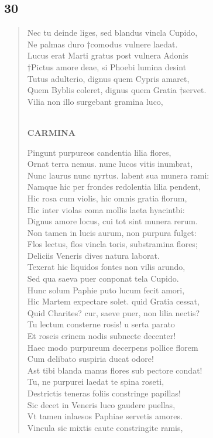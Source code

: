 \documentclass[11pt, a4paper]{report}
\begin{document}
            \subsection*{30}
      \begin{verse}
      Nec tu deinde liges, sed blandus vincla Cupido, \\ Ne palmas duro †comodus vulnere laedat. \\ Lucus erat Marti gratus post vulnera Adonis \\ †Pictus amore deae, si Phoebi lumina desint \\ Tutus adulterio, dignus quem Cypris amaret, \\ Quem Byblis coleret, dignus quem Gratia †servet. \\ Vilia non illo surgebant gramina luco, \\ 
        ﻿\pagebreak 
     \marginpar{[204]} \begin{center} \textbf{CARMINA} \end{center}Pingunt purpureos candentia lilia flores, \\ Ornat terra nemus. nunc lucos vitis inumbrat, \\ Nunc laurus nunc nyrtus. labent sua munera rami: \\ Namque hic per frondes redolentia lilia pendent, \\ Hic rosa cum violis, hic omnis gratia florum, \\ Hic inter violas coma mollis laeta hyacintbi: \\ Dignus amore locus, cui tot sint munera rerum. \\ Non tamen in lucis aurum, non purpura fulget: \\ Flos lectus, flos vincla toris, substramina flores; \\ Deliciis Veneris dives natura laborat. \\ Texerat hic liquidos fontes non vilis arundo, \\ Sed qua saeva puer conponat tela Cupido. \\ Hunc solum Paphie puto lucum fecit amori, \\ Hic Martem expectare solet. quid Gratia cessat, \\ Quid Charites? cur, saeve puer, non lilia nectis? \\ Tu lectum consterne rosis! u serta parato \\ Et roseis crinem nodis subnecte decenter! \\ Haec modo purpureum decerpens pollice florem \\ Cum delibato suspiria ducat odore! \\ Ast tibi blanda manus  \lbrack flores \rbrack  sub pectore condat! \\ Tu, ne purpurei laedat te spina roseti, \\ Destrictis teneras foliis constringe papillas! \\ Sic decet in Veneris luco gaudere puellas, \\ Vt tamen inlaesos Paphiae servetis amores. \\ Vincula sic mixtis caute constringite ramis, \\ 

\end{verse}
\end{document}
